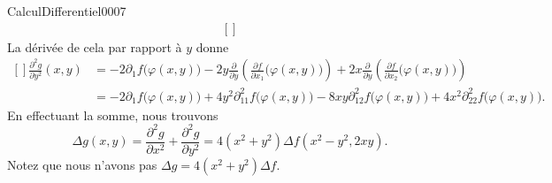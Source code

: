 \begin{corrige}{CalculDifferentiel0007}
\begin{equation}
\begin{aligned}[]
		\end{aligned}
	\end{equation}
	La dérivée de cela par rapport à $y$ donne
	\begin{equation}
		\begin{aligned}[]
			\frac{ \partial^2g }{ \partial y^2 }(x,y)&=-2\partial_1f\big( \varphi(x,y) \big)-2y\frac{ \partial  }{ \partial y }\left( \frac{ \partial f }{ \partial x_1 }\big( \varphi(x,y) \big) \right)+2x\frac{ \partial  }{ \partial y }\left( \frac{ \partial f }{ \partial x_2 }\big( \varphi(x,y) \big) \right)\\
			&=-2\partial_1f\big( \varphi(x,y) \big)+4y^2\partial^2_{11}f\big( \varphi(x,y) \big)-8xy\partial^2_{12}f\big( \varphi(x,y) \big)+4x^2\partial^2_{22}f\big( \varphi(x,y) \big).
		\end{aligned}
	\end{equation}
	En effectuant la somme, nous trouvons
	\begin{equation}
		\Delta g(x,y)=\frac{ \partial^2g }{ \partial x^2 }+\frac{ \partial^2g }{ \partial y^2 }=4(x^2+y^2)\Delta f(x^2-y^2,2xy).
	\end{equation}
	Notez que nous n'avons pas $\Delta g=4(x^2+y^2)\Delta f$.
	
	
	
\end{corrige}
